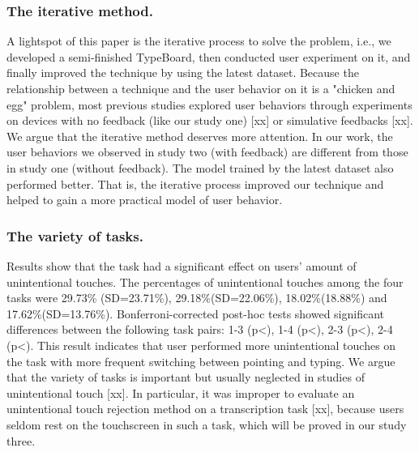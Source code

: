 \subsubsection{The iterative method.}

A lightspot of this paper is the iterative process to solve the problem, i.e., we developed a semi-finished TypeBoard, then conducted user experiment on it, and finally improved the technique by using the latest dataset. Because the relationship between a technique and the user behavior on it is a "chicken and egg" problem, most previous studies explored user behaviors through experiments on devices with no feedback (like our study one) [xx] or simulative feedbacks [xx]. We argue that the iterative method deserves more attention. In our work, the user behaviors we observed in study two (with feedback) are different from those in study one (without feedback). The model trained by the latest dataset also performed better. That is, the iterative process improved our technique and helped to gain a more practical model of user behavior.


\subsubsection{The variety of tasks.}

Results show that the task had a significant effect on users' amount of unintentional touches. The percentages of unintentional touches among the four tasks were 29.73\% (SD=23.71\%), 29.18\%(SD=22.06\%), 18.02\%(18.88\%) and 17.62\%(SD=13.76\%). Bonferroni-corrected post-hoc tests showed significant differences between the following task pairs: 1-3 (p<), 1-4 (p<), 2-3 (p<), 2-4 (p<). This result indicates that user performed more unintentional touches on the task with more frequent switching between pointing and typing. We argue that the variety of tasks is important but usually neglected in studies of unintentional touch [xx]. In particular, it was improper to evaluate an unintentional touch rejection method on a transcription task [xx], because users seldom rest on the touchscreen in such a task, which will be proved in our study three.

